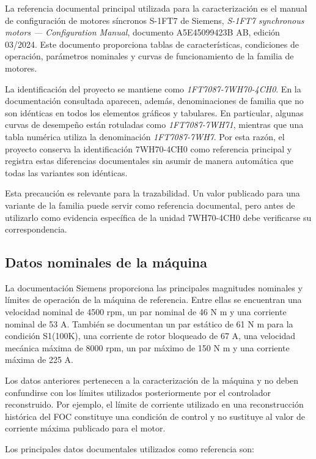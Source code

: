 La referencia documental principal utilizada para la caracterización es el manual de configuración de motores síncronos S-1FT7 de Siemens, \textit{S-1FT7 synchronous motors --- Configuration Manual}, documento A5E45099423B AB, edición 03/2024. Este documento proporciona tablas de características, condiciones de operación, parámetros nominales y curvas de funcionamiento de la familia de motores.

La identificación del proyecto se mantiene como \textit{1FT7087-7WH70-4CH0}. En la documentación consultada aparecen, además, denominaciones de familia que no son idénticas en todos los elementos gráficos y tabulares. En particular, algunas curvas de desempeño están rotuladas como \textit{1FT7087-7WH71}, mientras que una tabla numérica utiliza la denominación \textit{1FT7087-7WH7}. Por esta razón, el proyecto conserva la identificación 7WH70-4CH0 como referencia principal y registra estas diferencias documentales sin asumir de manera automática que todas las variantes son idénticas.

Esta precaución es relevante para la trazabilidad. Un valor publicado para una variante de la familia puede servir como referencia documental, pero antes de utilizarlo como evidencia específica de la unidad 7WH70-4CH0 debe verificarse su correspondencia.

\subsection{Datos nominales de la máquina}

La documentación Siemens proporciona las principales magnitudes nominales y límites de operación de la máquina de referencia. Entre ellas se encuentran una velocidad nominal de 4500 rpm, un par nominal de 46 N m y una corriente nominal de 53 A. También se documentan un par estático de 61 N m para la condición S1(100K), una corriente de rotor bloqueado de 67 A, una velocidad mecánica máxima de 8000 rpm, un par máximo de 150 N m y una corriente máxima de 225 A.

Los datos anteriores pertenecen a la caracterización de la máquina y no deben confundirse con los límites utilizados posteriormente por el controlador reconstruido. Por ejemplo, el límite de corriente utilizado en una reconstrucción histórica del FOC constituye una condición de control y no sustituye al valor de corriente máxima publicado para el motor.

Los principales datos documentales utilizados como referencia son:


